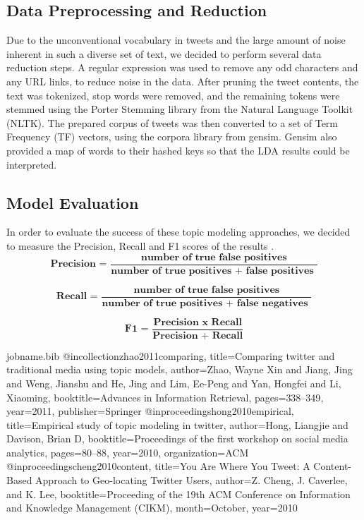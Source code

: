 \documentclass{acm_proc_article-sp}
\begin{document}
\subsection{Data Preprocessing and Reduction}
\hspace*{5mm}Due to the unconventional vocabulary in tweets and the large amount of noise inherent in such a diverse set of text, we decided to perform several data reduction steps. A regular expression was used to remove any odd characters and any URL links, to reduce noise in the data. After pruning the tweet contents, the text was tokenized, stop words were removed, and the remaining tokens were stemmed using the Porter Stemming library from the Natural Language Toolkit (NLTK). The prepared corpus of tweets was then converted to a set of Term Frequency (TF) vectors, using the corpora library from gensim. Gensim also provided a map of words to their hashed keys so that the LDA results could be interpreted.

\subsection{Model Evaluation}
\hspace*{5mm}In order to evaluate the success of these topic modeling approaches, we decided to measure the Precision, Recall and F1 scores of the results \cite{hong2010empirical}. 
\[ \textbf{Precision = }\frac{\textbf{number of true false positives}}{\textbf{number of true positives + false positives }} \]

\[ \textbf{Recall = }\frac{\textbf{number of true false positives}}{\textbf{number of true positives + false negatives }} \]

\[ \textbf{F1 = }\frac{\textbf{Precision x Recall}}{\textbf{Precision + Recall}} \]


\begin{filecontents}{jobname.bib}
@incollection{zhao2011comparing,
	title={Comparing twitter and traditional media using topic models},
	author={Zhao, Wayne Xin and Jiang, Jing and Weng, Jianshu and He, Jing and Lim, Ee-Peng and Yan, Hongfei and Li, Xiaoming},
	booktitle={Advances in Information Retrieval},
	pages={338--349},
	year={2011},
	publisher={Springer}
}
@inproceedings{hong2010empirical,
	title={Empirical study of topic modeling in twitter},
	author={Hong, Liangjie and Davison, Brian D},
	booktitle={Proceedings of the first workshop on social media analytics},
	pages={80--88},
	year={2010},
	organization={ACM}
}
@inproceedings{cheng2010content,
	title={You Are Where You Tweet: A Content-Based Approach to Geo-locating Twitter Users},
	author={Z. Cheng, J. Caverlee, and K. Lee},
	booktitle={Proceeding of the 19th ACM Conference on Information and Knowledge Management (CIKM)},
	month={October},
	year={2010}
}
\end{filecontents}

\nocite{*}




\end{document}

